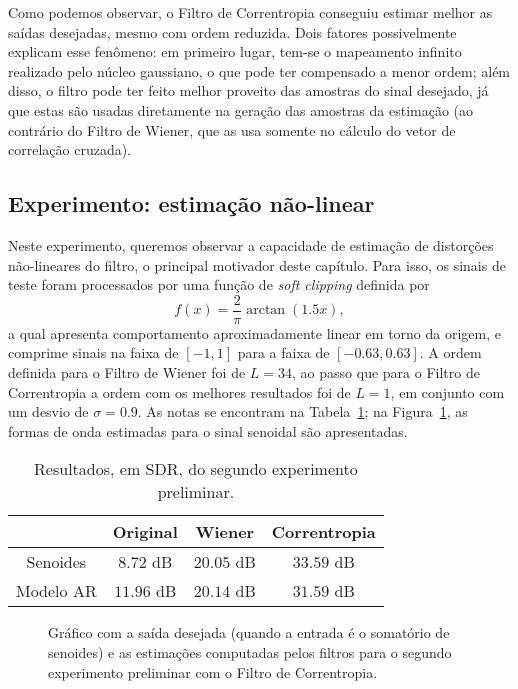 Como podemos observar, o Filtro de Correntropia conseguiu estimar melhor as saídas
desejadas, mesmo com ordem reduzida. Dois fatores possivelmente explicam esse fenômeno:
em primeiro lugar, tem-se o mapeamento infinito realizado pelo núcleo gaussiano, o que
pode ter compensado a menor ordem; além disso, o filtro pode ter feito melhor proveito
das amostras do sinal desejado, já que estas são usadas diretamente na geração das
amostras da estimação (ao contrário do Filtro de Wiener, que as usa somente no cálculo
do vetor de correlação cruzada).

\subsection{Experimento: estimação não-linear}

Neste experimento, queremos observar a capacidade de estimação de distorções
não-lineares do filtro, o principal motivador deste capítulo. Para isso, os sinais de
teste foram processados por uma função de \textit{soft clipping} definida por
\begin{equation}
	f(x) = \frac{2}{\pi} \arctan(1.5 x),
\end{equation}
a qual apresenta comportamento aproximadamente linear em torno da origem, e comprime sinais na faixa de $[-1, 1]$ para a faixa de $[-0.63, 0.63]$. A ordem definida para o Filtro de Wiener foi de $L = 34$, ao passo que para o Filtro de Correntropia a ordem com os melhores resultados foi de $L = 1$, em conjunto com um desvio de $\sigma = 0.9$. As notas se encontram na Tabela~\ref{tab:correntropy:poc-experiment-2}; na Figura~\ref{fig:correntropy:poc-experiment-2}, as formas de onda estimadas para o sinal senoidal são apresentadas.
	{\def\arraystretch{1.25}\tabcolsep=10pt
		\begin{table}[!ht]
			\centering
			\caption[Resultados do segundo experimento preliminar: estimação não-linear]{Resultados, em SDR, do segundo experimento preliminar.}
			\label{tab:correntropy:poc-experiment-2}
			\begin{tabular}{cccc}
				\toprule
				          & Original   & Wiener     & Correntropia \\ \midrule
				Senoides  & $8.72$ dB  & $20.05$ dB & $33.59$ dB   \\
				Modelo AR & $11.96$ dB & $20.14$ dB & $31.59$ dB   \\ \bottomrule
			\end{tabular}
		\end{table}
	}
\begin{figure}[!ht]
	\centering
	
	\caption[Saída desejada e estimações do segundo experimento preliminar]{Gráfico com a saída desejada (quando a entrada é o somatório de senoides) e as estimações computadas pelos filtros para o segundo experimento preliminar com o Filtro de Correntropia.}
	\label{fig:correntropy:poc-experiment-2}
\end{figure}

